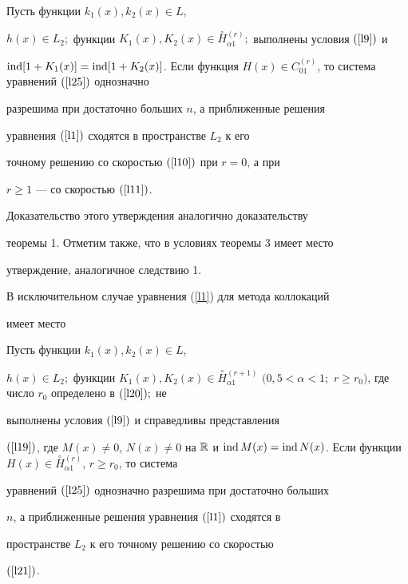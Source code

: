 \begin{thm}


Пусть функции $k_1(x), k_2(x)\in L$,


$h(x) \in L_2;$ функции $K_1(x), K_2(x)\in


\overset{\circ}{H}{}^{(r)}_{\alpha1};$ выполнены условия $(\ref{l9})$ и


$\ind  [1+K_1(x)]=\ind  [1+K_2(x)]$. Если функция $H(x)\in


C_{01}^{(r)}$, то система уравнений $(\ref{l25})$ однозначно


разрешима при достаточно больших $n$, а приближенные решения


уравнения $(\ref{l1})$ сходятся в пространстве $L_2$ к его


точному решению со скоростью $(\ref{l10})$ при $r=0$, а при


$r\geqslant 1$ --- со скоростью $(\ref{l11})$.


\end{thm}








Доказательство этого утверждения аналогично доказательству


теоремы 1. Отметим также, что в условиях теоремы 3 имеет место


утверждение, аналогичное следствию 1.





В исключительном случае уравнения (\ref{l1}) для метода коллокаций


имеет место








\begin{thm}


Пусть функции $k_1(x), k_2(x)\in L$,


$h(x) \in L_2;$ функции $K_1(x), K_2(x)\in


\overset{\circ}{H}{}^{(r+1)}_{\alpha1}$ $(0{,}5<\alpha<1;$ $r\geqslant


r_0)$, где число $r_0$ определено в $(\ref{l20});$ не


выполнены условия $(\ref{l9})$ и справедливы представления


$(\ref{l19})$, где $M(x)\neq 0$, $N(x)\neq 0$ на $\Bbb R$ и $\ind 


M(x)=\ind  N(x)$. Если функции $H(x)\in


\overset{\circ}{H}{}^{(r)}_{\alpha1}$, $r\geqslant r_0$, то система


уравнений $(\ref{l25})$ однозначно разрешима при достаточно больших


$n$, а приближенные решения уравнения $(\ref{l1})$ сходятся в


пространстве $L_2$ к его точному решению со скоростью


$(\ref{l21})$.


\end{thm}








